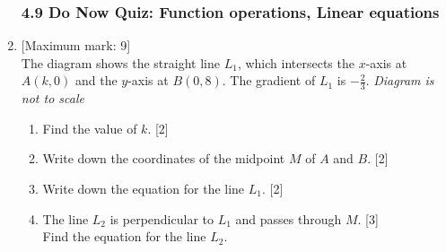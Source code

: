 \documentclass[12pt, twoside]{article}
\begin{document}
\begin{enumerate}
    \subsubsection*{4.9 Do Now Quiz: Function operations, Linear equations}

    \item {[Maximum mark: 9]} \\[0.3cm]
    The diagram shows the straight line $L_1$, which intersects the $x$-axis at $A(k, 0)$ and the $y$-axis at $B(0,8)$. The gradient of $L_1$ is $-\frac{2}{3}$. \hfill \emph{Diagram is not to scale}
        \begin{center}
        \end{center}
        \begin{enumerate}%
            \item Find the value of $k$. \hfill [2]
            \item Write down the coordinates of the midpoint $M$ of $A$ and $B$. \hfill [2]
            \item Write down the equation for the line $L_1$. \hfill [2]
            \item The line $L_2$ is perpendicular to $L_1$ and passes through $M$. \hfill [3]\\[0.2cm]
            Find the equation for the line $L_2$.
        \end{enumerate}


\end{enumerate}
\end{document}
